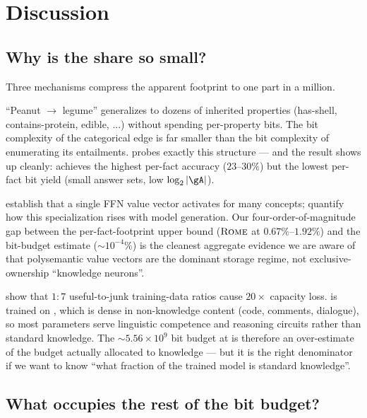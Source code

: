 \section{Discussion}
\label{sec:discussion}

\subsection{Why is the share so small?}

Three mechanisms compress the apparent footprint to one part in a million.

 ``Peanut \(\to\) legume'' generalizes to dozens of inherited properties (has-shell, contains-protein, edible, ...) without spending per-property bits. The bit complexity of the categorical edge is far smaller than the bit complexity of enumerating its entailments. \taxi probes exactly this structure --- and the result shows up cleanly: \taxi achieves the highest per-fact accuracy (\(23\)--\(30\%\)) but the lowest per-fact bit yield (small answer sets, low \(\log_2 |\gA|\)).

 \citet{geva2021ffnkv} establish that a single FFN value vector activates for many concepts; \citet{hong2025specialization} quantify how this specialization rises with model generation. Our four-order-of-magnitude gap between the per-fact-footprint upper bound (\(\textsc{Rome}\) at \(0.67\%\)--\(1.92\%\)) and the bit-budget estimate (\(\sim 10^{-4}\%\)) is the cleanest aggregate evidence we are aware of that polysemantic value vectors are the dominant storage regime, not exclusive-ownership ``knowledge neurons''.

 \citet{allenzhu2024knowledge} show that \(1{:}7\) useful-to-junk training-data ratios cause \(20\times\) capacity loss. \pythia is trained on \pile, which is dense in non-knowledge content (code, comments, dialogue), so most parameters serve linguistic competence and reasoning circuits rather than standard knowledge. The \(\sim 5.56 \times 10^9\) bit budget at \pythiaD is therefore an over-estimate of the budget actually allocated to knowledge --- but it is the right denominator if we want to know ``what fraction of the trained model is standard knowledge''.

\subsection{What occupies the rest of the bit budget?}

